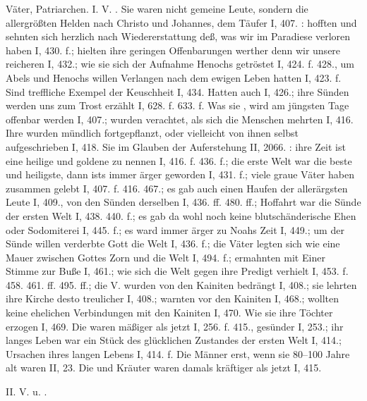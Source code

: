 Väter, Patriarchen. I.  V. . Sie waren nicht gemeine Leute, sondern die allergrößten Helden nach Christo und Johannes, dem Täufer I, 407. : hofften und sehnten sich herzlich nach Wiedererstattung deß, was wir im Paradiese verloren haben I, 430. f.; hielten ihre geringen Offenbarungen werther denn wir unsere reicheren I, 432.; wie sie sich der Aufnahme Henochs getröstet I, 424. f. 428., um Abels und Henochs willen Verlangen nach dem ewigen Leben hatten I, 423. f. Sind treffliche Exempel der Keuschheit I, 434. Hatten auch  I, 426.; ihre Sünden werden uns zum Trost erzählt I, 628. f. 633. f. Was sie , wird am jüngsten Tage offenbar werden I, 407.; wurden verachtet, als sich die Menschen mehrten I, 416. Ihre  wurden mündlich fortgepflanzt, oder vielleicht von ihnen selbst aufgeschrieben I, 418. Sie  im Glauben der Auferstehung II, 2066. : ihre Zeit ist eine heilige und goldene zu nennen I, 416. f. 436. f.; die erste Welt war die beste und heiligste, dann ists immer ärger geworden I, 431. f.; viele graue Väter haben zusammen gelebt I, 407. f. 416. 467.; es gab auch einen Haufen der allerärgsten Leute I, 409., von den Sünden derselben I, 436. ff. 480. ff.; Hoffahrt war die Sünde der ersten Welt I, 438. 440. f.; es gab da wohl noch keine blutschänderische Ehen oder Sodomiterei I, 445. f.; es ward immer ärger zu Noahs Zeit I, 449.; um der Sünde willen verderbte Gott die Welt I, 436. f.; die Väter legten sich wie eine Mauer zwischen Gottes Zorn und die Welt I, 494. f.; ermahnten mit Einer Stimme zur Buße I, 461.; wie sich die Welt gegen ihre Predigt verhielt I, 453. f. 458. 461. ff. 495. ff.; die V. wurden von den Kainiten bedrängt I, 408.; sie lehrten ihre Kirche desto treulicher I, 408.; warnten vor den Kainiten I, 468.; wollten keine ehelichen Verbindungen mit den Kainiten I, 470. Wie sie ihre Töchter erzogen I, 469. Die  waren mäßiger als jetzt I, 256. f. 415., gesünder I, 253.; ihr langes Leben war ein Stück des glücklichen Zustandes der ersten Welt I, 414.; Ursachen ihres langen Lebens I, 414. f. Die Männer  erst, wenn sie 80–100 Jahre alt waren II, 23. Die  und Kräuter waren damals kräftiger als jetzt I, 415.

II.  V.  u. .

